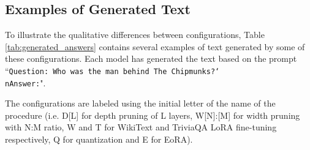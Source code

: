 \subsection{Examples of Generated Text} \label{sec:generated_text}
To illustrate the qualitative differences between configurations, Table \ref{tab:generated_answers} contains several examples of text generated by some of these configurations. Each model has generated the text based on the prompt ``\texttt{Question: Who was the man behind The Chipmunks?\char`\\nAnswer:}".

The configurations are labeled using the initial letter of the name of the procedure (i.e. D[L] for depth pruning of L layers, W[N]:[M] for width pruning with N:M ratio, W and T for WikiText and TriviaQA LoRA fine-tuning respectively, Q for quantization and E for EoRA).

